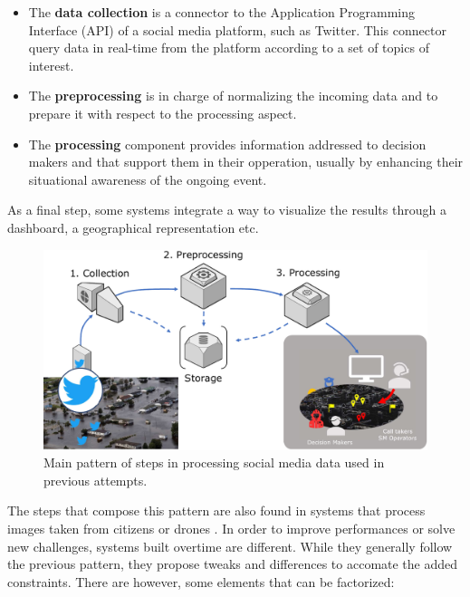 \begin{itemize}
    \item The \textbf{data collection} is a connector to the Application Programming Interface (API) of a
          social media platform, such as Twitter.
          This connector query data in real-time from the platform according to a set of topics of interest.
    \item The \textbf{preprocessing} is in charge of normalizing the incoming data and to prepare
          it with respect to the processing aspect.
    \item The \textbf{processing} component provides information addressed to decision makers and
          that support them in their opperation, usually by enhancing their situational awareness
          of the ongoing event.
\end{itemize}

As a final step, some systems integrate a way to visualize the results through a dashboard, a geographical representation etc.

\begin{figure}[htb]
    \centering
    \includegraphics[width=\textwidth]{figures/chap-5/social-media-processing.pdf}
    \caption{Main pattern of steps in processing social media data used in previous attempts.}
    \label{system:sm-processing}
\end{figure}

The steps that compose this pattern are also found in systems that process images taken from citizens \parencite{alamImage4ActOnlineSocial2017} or drones \parencite{fanDisasterCityDigital2021}.
In order to improve performances or solve new challenges, systems built overtime are different.
While they generally follow the previous pattern, they propose tweaks and differences to accomate the added constraints.
There are however, some elements that can be factorized:

